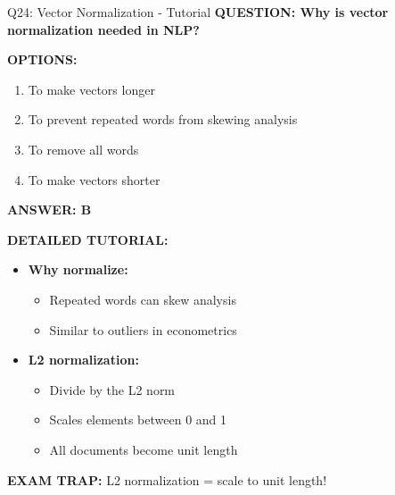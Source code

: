 \documentclass[8pt]{beamer}
\begin{document}
	\begin{frame}{Q24: Vector Normalization - Tutorial}
		\fontsize{6.5}{7.5}\selectfont
		\textbf{QUESTION: Why is vector normalization needed in NLP?}
		
		\vspace{0.1cm}
		\textbf{OPTIONS:}
		\begin{enumerate}
			\item To make vectors longer
			\item To prevent repeated words from skewing analysis
			\item To remove all words
			\item To make vectors shorter
		\end{enumerate}
		
		\vspace{0.1cm}
		\textcolor{myblue}{\textbf{ANSWER: B}}
		
		\vspace{0.1cm}
		\textbf{DETAILED TUTORIAL:}
		\begin{itemize}
			\item \textbf{Why normalize:}
			\begin{itemize}
				\item Repeated words can skew analysis
				\item Similar to outliers in econometrics
			\end{itemize}
			\item \textbf{L2 normalization:}
			\begin{itemize}
				\item Divide by the L2 norm
				\item Scales elements between 0 and 1
				\item All documents become unit length
			\end{itemize}
		\end{itemize}
		
		\textcolor{myred}{\textbf{EXAM TRAP:}} L2 normalization = \textcolor{myblue}{scale to unit length}!
	\end{frame}
	
\end{document}
